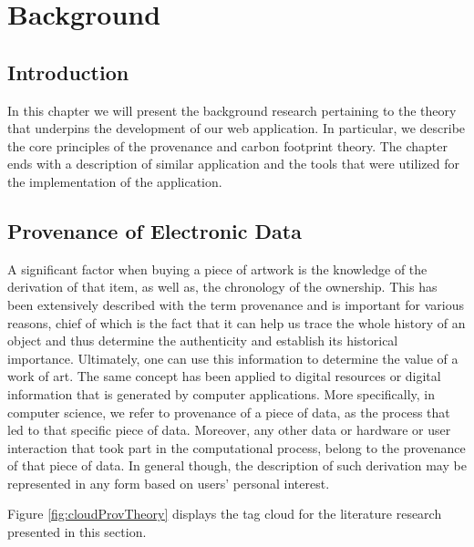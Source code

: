 
\chapter{Background} %
\label{Background}

\section{Introduction}

In this chapter we will present the background research pertaining to the theory that underpins the development of our web application. In particular, we describe the core principles of the provenance and carbon footprint theory. The chapter ends with a description of similar application and the tools that were utilized for the implementation of the application.

\section{Provenance of Electronic Data}

A significant factor when buying a piece of artwork is the knowledge of the derivation of that item, as well as, the chronology of the ownership. This has been extensively described with the term provenance and is important for various reasons, chief of which is the fact that it can help us trace the whole history of an object and thus determine the authenticity and establish its historical importance.  Ultimately, one can use this information to determine the value of a work of art.
The same concept has been applied to digital resources or digital information that is generated by computer applications\cite{reference5}. More specifically, in computer science, we refer to provenance of a piece of data, as the process that led to that specific piece of data\cite{reference1}. Moreover, any other data or hardware or user interaction that took part in the computational process, belong to the provenance of that piece of data. In general though, the description of such derivation may be represented in any form based on users' personal interest\cite{reference9}.

Figure \ref{fig:cloudProvTheory} displays the tag cloud for the literature research presented in this section.

